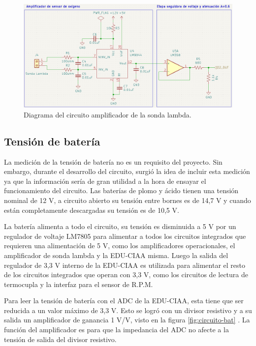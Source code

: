 \begin{figure}[htpb]
\centering
\includegraphics[width=\textwidth]{./Figures/ampli-o2.png}
\caption{Diagrama del circuito amplificador de la sonda lambda.}
\label{fig:circuito-o2}
\end{figure}

\subsection{Tensión de batería}

La medición de la tensión de batería no es un requisito del proyecto. Sin embargo, durante el desarrollo del circuito, surgió la idea de incluir esta medición ya que la información sería de gran utilidad a la hora de ensayar el funcionamiento del circuito.
Las baterías de plomo y ácido tienen una tensión nominal de 12 V, a circuito abierto su tensión entre bornes es de 14,7 V y cuando están completamente descargadas su tensión es de 10,5 V.

La batería alimenta a todo el circuito, su tensión es disminuida a 5 V por un regulador de voltaje LM7805 para alimentar a todos los circuitos integrados que requieren una alimentación de 5 V, como los amplificadores operacionales, el amplificador de sonda lambda y la EDU-CIAA misma. Luego la salida del regulador de 3,3 V interno de la EDU-CIAA es utilizada para alimentar el resto de los circuitos integrados que operan con 3,3 V, como los circuitos de lectura de termocupla y la interfaz para el sensor de R.P.M.

Para leer la tensión de batería con el ADC de la EDU-CIAA, esta tiene que ser reducida a un valor máximo de 3,3 V. Esto se logró con un divisor resistivo y a su salida un amplificador de ganancia 1 V/V, visto en la figura \ref{fig:circuito-bat} . La función del amplificador es para que la impedancia del ADC no afecte a la tensión de salida del divisor resistivo.

